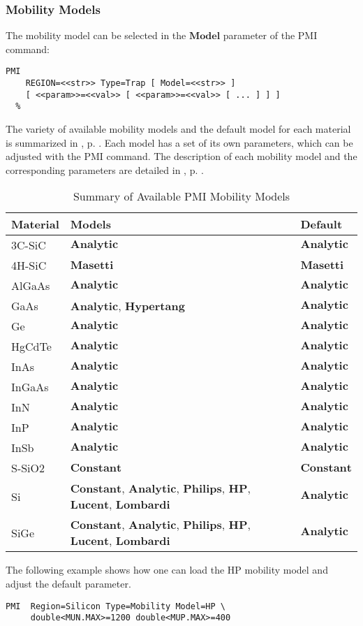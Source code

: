 \documentclass[oneside,12pt]{cgd_book}
\begin{document}
\subsubsection{Mobility Models}
\label{sec:CmdRef:PMI:Mobility}
The mobility model can be selected in the $\mathbf{Model}$ parameter of the PMI
          command:
\par
\begin{lstlisting}[style=GeniusCmd]
PMI
    REGION=<<str>> Type=Trap [ Model=<<str>> ]
    [ <<param>>=<<val>> [ <<param>>=<<val>> [ ... ] ] ]
  %
\end{lstlisting}
The variety of available mobility models and the default model for each material is summarized in
, p. \pageref{tab:CmdRef:PMI:Mobility:Summary}. Each model has a set of its own parameters, which can be
          adjusted with the PMI command. The description of each mobility model and the corresponding parameters are
          detailed in , p. \pageref{sec:Equation:Mobility}.
\par
\begin{longtable}{lll}
\caption{\label{tab:CmdRef:PMI:Mobility:Summary}Summary of Available PMI Mobility Models}\\
\hline
 Material
& Models
& Default\\
\hline
 3C-SiC
& $\mathbf{Analytic}$
& $\mathbf{Analytic}$
\\
 4H-SiC
& $\mathbf{Masetti}$
& $\mathbf{Masetti}$
\\
 AlGaAs
& $\mathbf{Analytic}$
& $\mathbf{Analytic}$
\\
 GaAs
& $\mathbf{Analytic}$, $\mathbf{Hypertang}$
& $\mathbf{Analytic}$
\\
 Ge
& $\mathbf{Analytic}$
& $\mathbf{Analytic}$
\\
 HgCdTe
& $\mathbf{Analytic}$
& $\mathbf{Analytic}$
\\
 InAs
& $\mathbf{Analytic}$
& $\mathbf{Analytic}$
\\
 InGaAs
& $\mathbf{Analytic}$
& $\mathbf{Analytic}$
\\
 InN
& $\mathbf{Analytic}$
& $\mathbf{Analytic}$
\\
 InP
& $\mathbf{Analytic}$
& $\mathbf{Analytic}$
\\
 InSb
& $\mathbf{Analytic}$
& $\mathbf{Analytic}$
\\
 S-SiO2
& $\mathbf{Constant}$
& $\mathbf{Constant}$
\\
 Si
& $\mathbf{Constant}$, $\mathbf{Analytic}$, $\mathbf{Philips}$, $\mathbf{HP}$,
$\mathbf{Lucent}$, $\mathbf{Lombardi}$
& $\mathbf{Analytic}$
\\
 SiGe
& $\mathbf{Constant}$, $\mathbf{Analytic}$, $\mathbf{Philips}$, $\mathbf{HP}$,
$\mathbf{Lucent}$, $\mathbf{Lombardi}$
& $\mathbf{Analytic}$\\
\end{longtable}
The following example shows how one can load the HP mobility model and adjust the default
          parameter.
\par
\begin{lstlisting}[style=GeniusCode]
PMI  Region=Silicon Type=Mobility Model=HP \
     double<MUN.MAX>=1200 double<MUP.MAX>=400
\end{lstlisting}
\end{document}
